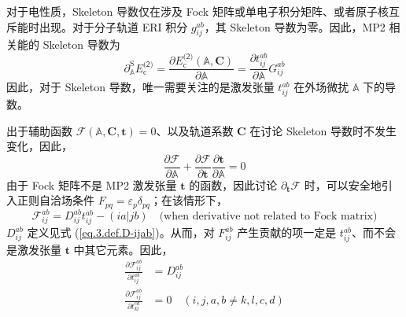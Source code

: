 对于电性质，Skeleton 导数仅在涉及 Fock 矩阵或单电子积分矩阵、或者原子核互斥能时出现。对于分子轨道 ERI 积分 $g_{ij}^{ab}$，其 Skeleton 导数为零。因此，MP2 相关能的 Skeleton 导数为
\begin{equation}
  \label{eq.3.pdSA-Ec-MP2-0}
  \partial_{\mathbb{A}}^\mathrm{S} E_\mathrm{c}^\textsf{(2)} = \frac{\partial E_\mathrm{c}^\textsf{(2)} (\mathbb{A}, \mathbf{C})}{\partial \mathbb{A}} = \frac{\partial t_{ij}^{ab}}{\partial \mathbb{A}} G_{ij}^{ab}
\end{equation}
因此，对于 Skeleton 导数，唯一需要关注的是激发张量 $t_{ij}^{ab}$ 在外场微扰 $\mathbb{A}$ 下的导数。

出于辅助函数 $\pmb{\mathscr{F}} (\mathbb{A}, \mathbf{C}, \mathbf{t}) = 0$、以及轨道系数 $\mathbf{C}$ 在讨论 Skeleton 导数时不发生变化，因此，
\begin{equation}
  \label{eq.3.auxfunc-pdA}
  \frac{\partial \pmb{\mathscr{F}}}{\partial \mathbb{A}} + \frac{\partial \pmb{\mathscr{F}}}{\partial \mathbf{t}} \frac{\partial \mathbf{t}}{\partial \mathbb{A}} = 0
\end{equation}
由于 Fock 矩阵不是 MP2 激发张量 $\mathbf{t}$ 的函数，因此讨论 $\partial_\mathbf{t} \pmb{\mathscr{F}}$ 时，可以安全地引入正则自洽场条件 $F_{pq} = \varepsilon_p \delta_{pq}$；在该情形下，
\begin{equation*}
  \mathscr{F}_{ij}^{ab} = D_{ij}^{ab} t_{ij}^{ab} - (ia|jb) \quad \text{(when derivative not related to Fock matrix)}
\end{equation*}
$D_{ij}^{ab}$ 定义见式 (\ref{eq.3.def.D-ijab})。从而，对 $F_{ij}^{ab}$ 产生贡献的项一定是 $t_{ij}^{ab}$、而不会是激发张量 $\mathbf{t}$ 中其它元素。因此，
\begin{align}
  \label{eq.3.auxfunc-pdt}
  \frac{\partial \mathscr{F}_{ij}^{ab}}{\partial t_{ij}^{ab}} &= D_{ij}^{ab} \\
  \frac{\partial \mathscr{F}_{ij}^{ab}}{\partial t_{kl}^{cd}} &= 0 \quad (i,j,a,b \neq k,l,c,d)
\end{align}

